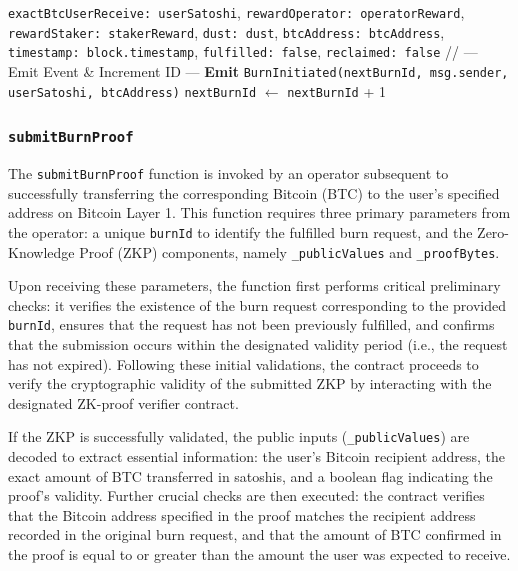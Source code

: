 \documentclass{DESSThesis}
\begin{document}
\begin{algorithm}
\begin{algorithmic}[1]
{            \State \quad \texttt{exactBtcUserReceive: userSatoshi},
            \State \quad \texttt{rewardOperator: operatorReward},
            \State \quad \texttt{rewardStaker: stakerReward},
            \State \quad \texttt{dust: dust},
            \State \quad \texttt{btcAddress: btcAddress},
            \State \quad \texttt{timestamp: block.timestamp},
            \State \quad \texttt{fulfilled: false},
            \State \quad \texttt{reclaimed: false}
        }
        \State
        \State // --- Emit Event \& Increment ID ---
        \State \textbf{Emit} \texttt{BurnInitiated(nextBurnId, msg.sender, userSatoshi, btcAddress)}
        \State \texttt{nextBurnId} $\gets$ \texttt{nextBurnId} + 1
    \EndProcedure
\end{algorithmic}
\end{algorithm}


\subsubsection{\texttt{submitBurnProof}}
The \texttt{submitBurnProof} function is invoked by an operator subsequent to successfully transferring the corresponding Bitcoin (BTC) to the user's specified address on Bitcoin Layer 1. This function requires three primary parameters from the operator: a unique \texttt{burnId} to identify the fulfilled burn request, and the Zero-Knowledge Proof (ZKP) components, namely \texttt{\_publicValues} and \texttt{\_proofBytes}.

Upon receiving these parameters, the function first performs critical preliminary checks: it verifies the existence of the burn request corresponding to the provided \texttt{burnId}, ensures that the request has not been previously fulfilled, and confirms that the submission occurs within the designated validity period (i.e., the request has not expired). Following these initial validations, the contract proceeds to verify the cryptographic validity of the submitted ZKP by interacting with the designated ZK-proof verifier contract.

If the ZKP is successfully validated, the public inputs (\texttt{\_publicValues}) are decoded to extract essential information: the user's Bitcoin recipient address, the exact amount of BTC transferred in satoshis, and a boolean flag indicating the proof's validity. Further crucial checks are then executed: the contract verifies that the Bitcoin address specified in the proof matches the recipient address recorded in the original burn request, and that the amount of BTC confirmed in the proof is equal to or greater than the amount the user was expected to receive.
\end{document}
